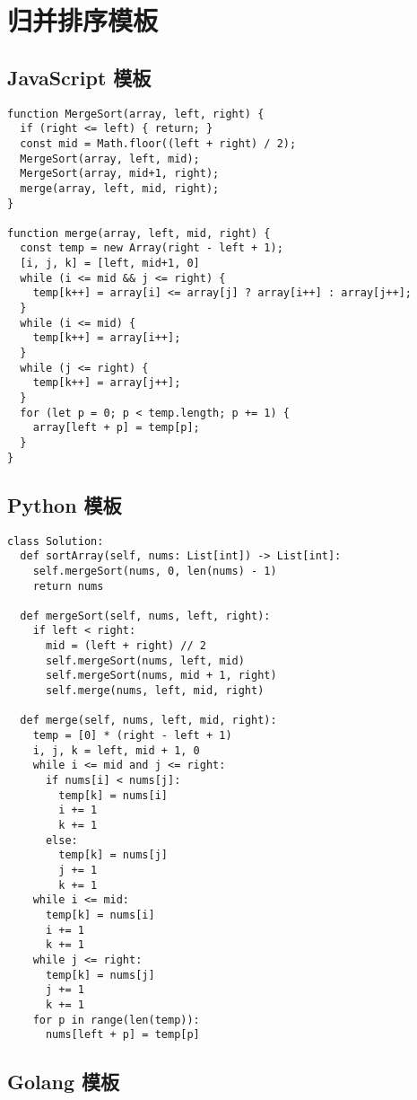 \newpage
\section{归并排序模板}

\subsection{JavaScript 模板}

\begin{verbatim}
function MergeSort(array, left, right) {
  if (right <= left) { return; }
  const mid = Math.floor((left + right) / 2);
  MergeSort(array, left, mid);
  MergeSort(array, mid+1, right);
  merge(array, left, mid, right);
}

function merge(array, left, mid, right) {
  const temp = new Array(right - left + 1);
  [i, j, k] = [left, mid+1, 0]
  while (i <= mid && j <= right) {
    temp[k++] = array[i] <= array[j] ? array[i++] : array[j++];
  }
  while (i <= mid) {
    temp[k++] = array[i++];
  }
  while (j <= right) {
    temp[k++] = array[j++];
  }
  for (let p = 0; p < temp.length; p += 1) {
    array[left + p] = temp[p];
  }
}
\end{verbatim}

\subsection{Python 模板}

\begin{verbatim}
class Solution:
  def sortArray(self, nums: List[int]) -> List[int]:
    self.mergeSort(nums, 0, len(nums) - 1)
    return nums

  def mergeSort(self, nums, left, right):
    if left < right:
      mid = (left + right) // 2
      self.mergeSort(nums, left, mid)
      self.mergeSort(nums, mid + 1, right)
      self.merge(nums, left, mid, right)

  def merge(self, nums, left, mid, right):
    temp = [0] * (right - left + 1)
    i, j, k = left, mid + 1, 0
    while i <= mid and j <= right:
      if nums[i] < nums[j]:
        temp[k] = nums[i]
        i += 1
        k += 1
      else:
        temp[k] = nums[j]
        j += 1
        k += 1
    while i <= mid:
      temp[k] = nums[i]
      i += 1
      k += 1
    while j <= right:
      temp[k] = nums[j]
      j += 1
      k += 1
    for p in range(len(temp)):
      nums[left + p] = temp[p]
\end{verbatim}

\subsection{Golang 模板}

